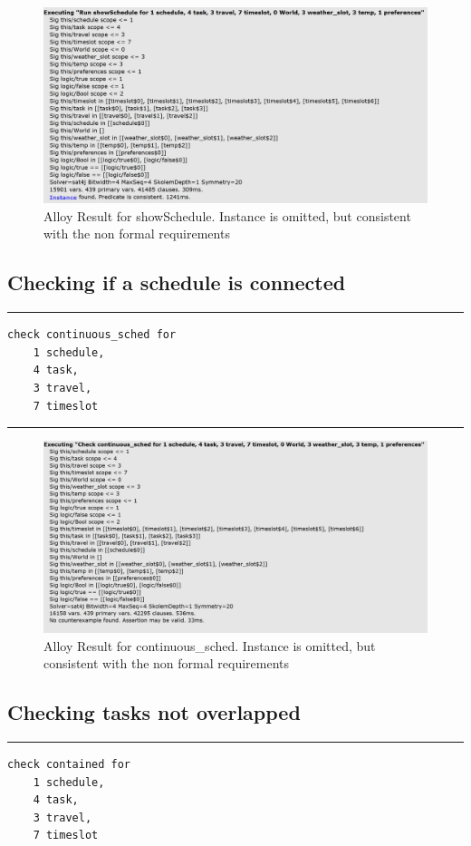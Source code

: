 \begin{figure}[H]
\centering
\includegraphics[scale=0.7]{Pictures/showSchedule.PNG}
\caption{Alloy Result for showSchedule. Instance is omitted, but
consistent with the non formal requirements}
\end{figure}
\subsection{Checking if a schedule is connected}
\rule{\textwidth}{0.4pt}
\begin{verbatim}
check continuous_sched for  
    1 schedule, 
    4 task, 
    3 travel, 
    7 timeslot
\end{verbatim}
\rule{\textwidth}{0.4pt}

\begin{figure}[H]
\centering
\includegraphics[scale=0.7]{Pictures/assert_continuous.PNG}
\caption{Alloy Result for continuous_sched. Instance is omitted, but
consistent with the non formal requirements}
\end{figure}
\subsection{Checking tasks not overlapped}
\rule{\textwidth}{0.4pt}
\begin{verbatim}
check contained for 
    1 schedule, 
    4 task, 
    3 travel, 
    7 timeslot
\end{verbatim}

